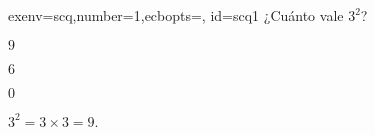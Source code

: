 \begin{Contents}{exenv=scq,number=1,ecbopts={}, id=scq1}
¿Cuánto vale $3^2$?%
	\begin{choice}[x]
		$9$	
	\end{choice}	
	\begin{choice}
		$6$	
	\end{choice}
	\begin{choice}
		$0$
	\end{choice}
	\begin{feedback}
		$3^2=3\times 3 = 9$.
	\end{feedback}
\end{Contents}
